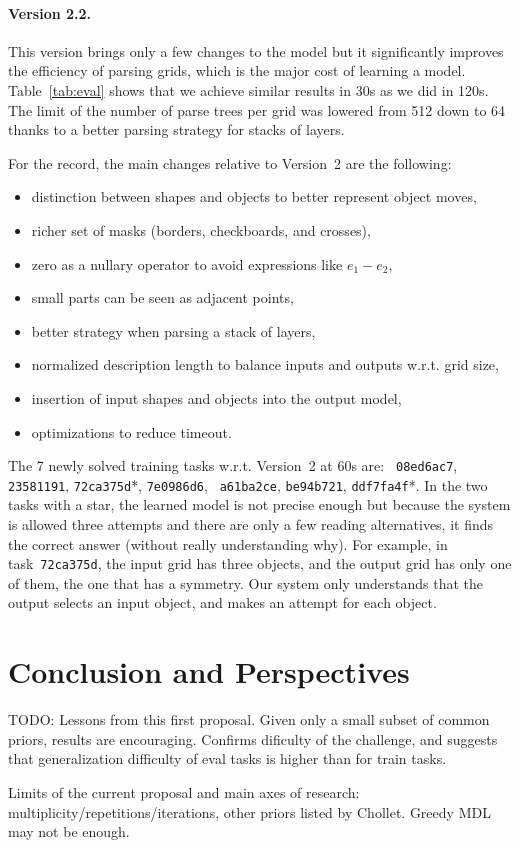 \documentclass[a4paper]{llncs}
\begin{document}
\paragraph{Version 2.2.} This version brings only a few changes to the
model but it significantly improves the efficiency of parsing grids,
which is the major cost of learning a model. Table~\ref{tab:eval}
shows that we achieve similar results in 30s as we did in 120s. The
limit of the number of parse trees per grid was lowered from 512 down
to 64 thanks to a better parsing strategy for stacks of layers.

For the record, the main changes relative to Version~2 are the following:
\begin{itemize}
\item distinction between shapes and objects to better represent object moves,
\item richer set of masks (borders, checkboards, and crosses),
\item zero as a nullary operator to avoid expressions like $e_1 - e_2$,
\item small parts can be seen as adjacent points,
\item better strategy when parsing a stack of layers,
\item normalized description length to balance inputs and outputs w.r.t. grid size,
\item insertion of input shapes and objects into the output model,
\item optimizations to reduce timeout.
\end{itemize}

The 7 newly solved training tasks w.r.t. Version~2 at 60s are: {\tt
  08ed6ac7}, {\tt 23581191}, {\tt 72ca375d}*, {\tt 7e0986d6}, {\tt
  a61ba2ce}, {\tt be94b721}, {\tt ddf7fa4f}*. In the two tasks with a
star, the learned model is not precise enough but because the system
is allowed three attempts and there are only a few reading
alternatives, it finds the correct answer (without really
understanding why). For example, in task~{\tt 72ca375d}, the input
grid has three objects, and the output grid has only one of them, the
one that has a symmetry. Our system only understands that the output
selects an input object, and makes an attempt for each object.


\section{Conclusion and Perspectives}
\label{conclu}

TODO: Lessons from this first proposal. Given only a small subset of common priors, results are encouraging. Confirms dificulty of the challenge, and suggests that generalization difficulty of eval tasks is higher than for train tasks.

Limits of the current proposal and main axes of research: multiplicity/repetitions/iterations, other priors listed by Chollet. Greedy MDL may not be enough.



\end{document}
